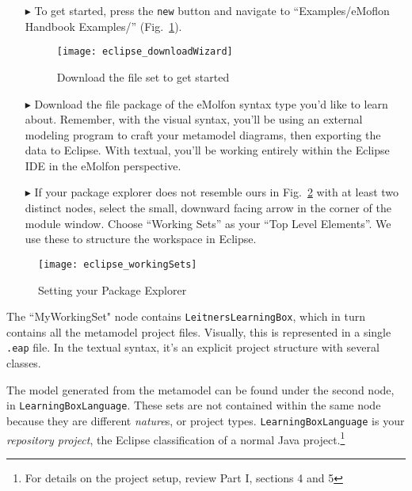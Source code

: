 \begin{itemize}

\item[$\blacktriangleright$] To get started, press the \texttt{new} button and navigate to ``Examples/eMoflon Handbook Examples/''
(Fig.~\ref{fig:downloadWizard}).

\begin{figure}[htbp]
	\centering
  \texttt{[image: eclipse\_downloadWizard]}
	\caption{Download the file set to get started}
	\label{fig:downloadWizard}
\end{figure}

\item[$\blacktriangleright$] Download the file package of the eMolfon syntax type you'd like to learn about. Remember, with the visual syntax, you'll be using
an external modeling program to craft your metamodel diagrams, then exporting the data to Eclipse. With textual, you'll be working entirely within the
Eclipse IDE in the eMolfon perspective.

\newpage

\vspace*{0.5cm}

\item[$\blacktriangleright$] If your package explorer does not resemble ours in Fig.~\ref{fig:workingSets} with at least two distinct nodes, select the
small, downward facing arrow in the corner of the module window. Choose ``Working Sets'' as your ``Top Level Elements''. We use these to structure the workspace
in Eclipse.

\vspace{0.75cm}

\end{itemize}

\begin{figure}[htbp]
	\centering
  \texttt{[image: eclipse\_workingSets]}
	\caption{Setting your Package Explorer}
	\label{fig:workingSets}
\end{figure}

The ``MyWorkingSet" node contains \texttt{LeitnersLearningBox}, which in turn contains all the metamodel project files. Visually, this is represented in a
single \texttt{.eap} file. In the textual syntax, it's an explicit project structure with several classes. 

The model generated from the metamodel can be found under the second node, in \texttt{LearningBoxLanguage}. These sets are not contained within the same node
because they are different \emph{nature}s, or project types. \texttt{Learning\-Box\-Language} is your \emph{repository project}, the Eclipse classification of a
normal Java project.\footnote{For details on the project setup, review Part I, sections 4 and 5} 

